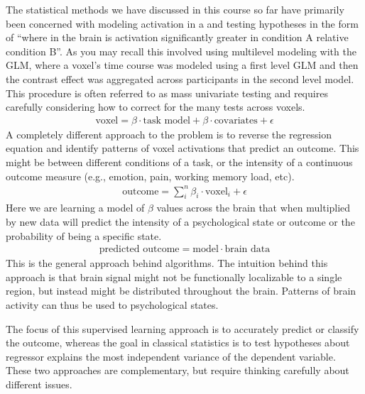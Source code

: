 \documentclass[letterpaper,10pt,english]{sphinxmanual}
\begin{document}
The statistical methods we have discussed in this course so far have primarily been concerned with modeling activation in a  and testing hypotheses in the form of “where in the brain is activation significantly greater in condition A relative condition B”. As you may recall this involved using multilevel modeling with the GLM, where a voxel’s time course was modeled using a first level GLM and then the contrast effect was aggregated across participants in the second level model. This procedure is often referred to as mass univariate testing and requires carefully considering how to correct for the many tests across voxels.
\begin{equation*}
\begin{split}\text{voxel} = \beta \cdot \text{task model} + \beta \cdot \text{covariates} + \epsilon\end{split}
\end{equation*}
A completely different approach to the problem is to reverse the regression equation and identify patterns of voxel activations that predict an outcome. This might be  between different conditions of a task, or  the intensity of a continuous outcome measure (e.g., emotion, pain, working memory load, etc).
\begin{equation*}
\begin{split}\text{outcome} = \sum_{i}^n \beta_i\cdot \text{voxel}_i + \epsilon\end{split}
\end{equation*}
Here we are learning a model of \(\beta\) values across the brain that when multiplied by new data will predict the intensity of a psychological state or outcome or the probability of being a specific state.
\begin{equation*}
\begin{split}\text{predicted outcome} = \text{model} \cdot \text{brain data}\end{split}
\end{equation*}
This is the general approach behind  algorithms. The intuition behind this approach is that brain signal might not be functionally localizable to a single region, but instead might be distributed throughout the brain. Patterns of brain activity can thus be used to  psychological states.

The focus of this supervised learning approach is to accurately predict or classify the outcome, whereas the goal in classical statistics is to test hypotheses about  regressor explains the most independent variance of the dependent variable. These two approaches are complementary, but require thinking carefully about different issues.
\end{document}

